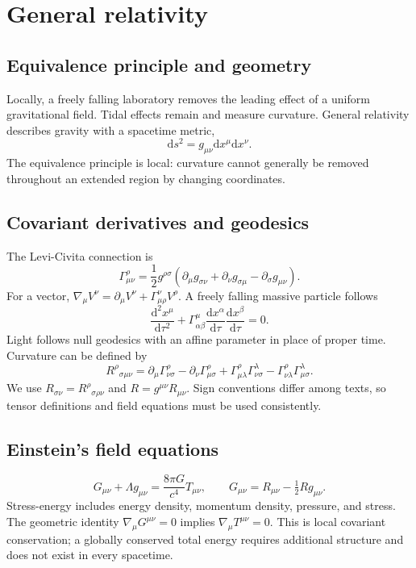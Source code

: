 \documentclass[11pt,oneside]{book}
\newcommand{\dd}{\mathrm{d}}
\theoremstyle{reviewstyle}
\begin{document}
\chapter{General relativity}
\section{Equivalence principle and geometry}
Locally, a freely falling laboratory removes the leading effect of a uniform gravitational field. Tidal effects remain and measure curvature. General relativity describes gravity with a spacetime metric,
\begin{equation}\dd s^2=g_{\mu\nu}\dd x^\mu\dd x^\nu.\end{equation}
The equivalence principle is local: curvature cannot generally be removed throughout an extended region by changing coordinates.
\section{Covariant derivatives and geodesics}
The Levi-Civita connection is
\begin{equation}
\Gamma^\rho_{\mu\nu}=\frac12g^{\rho\sigma}(\partial_\mu g_{\sigma\nu}+\partial_\nu g_{\sigma\mu}-\partial_\sigma g_{\mu\nu}).
\end{equation}
For a vector, $\nabla_\mu V^\nu=\partial_\mu V^\nu+\Gamma^\nu_{\mu\rho}V^\rho$. A freely falling massive particle follows
\begin{equation}\frac{\dd^2x^\mu}{\dd\tau^2}+\Gamma^\mu_{\alpha\beta}\frac{\dd x^\alpha}{\dd\tau}\frac{\dd x^\beta}{\dd\tau}=0.\end{equation}
Light follows null geodesics with an affine parameter in place of proper time. Curvature can be defined by
\begin{equation}
R^\rho{}_{\sigma\mu\nu}=\partial_\mu\Gamma^\rho_{\nu\sigma}-\partial_\nu\Gamma^\rho_{\mu\sigma}
+\Gamma^\rho_{\mu\lambda}\Gamma^\lambda_{\nu\sigma}-\Gamma^\rho_{\nu\lambda}\Gamma^\lambda_{\mu\sigma}.
\end{equation}
We use $R_{\sigma\nu}=R^\rho{}_{\sigma\rho\nu}$ and $R=g^{\mu\nu}R_{\mu\nu}$. Sign conventions differ among texts, so tensor definitions and field equations must be used consistently.
\section{Einstein's field equations}
\begin{equation}\boxed{G_{\mu\nu}+\Lambda g_{\mu\nu}=\frac{8\pi G}{c^4}T_{\mu\nu},\qquad G_{\mu\nu}=R_{\mu\nu}-\tfrac12Rg_{\mu\nu}.}\end{equation}
Stress-energy includes energy density, momentum density, pressure, and stress. The geometric identity $\nabla_\mu G^{\mu\nu}=0$ implies $\nabla_\mu T^{\mu\nu}=0$. This is local covariant conservation; a globally conserved total energy requires additional structure and does not exist in every spacetime.
\end{document}

